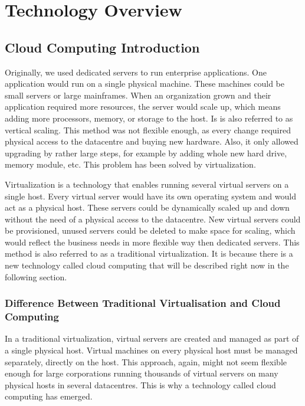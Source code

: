 
\chapter{Technology Overview}
\label{ch:overview}

\section{Cloud Computing Introduction}
\label{se:cloud-intro}
Originally, we used dedicated servers to run enterprise applications. One application would run on a single physical machine. These machines could be small servers or large mainframes. When an organization grown and their application required more resources, the server would scale up, which means adding more processors, memory, or storage to the host. Is is also referred to as vertical scaling. This method was not flexible enough, as every change required physical access to the datacentre and buying new hardware. Also, it only allowed upgrading by rather large steps, for example by adding whole new hard drive, memory module, etc. This problem has been solved by virtualization.

Virtualization is a technology that enables running several virtual servers on a single host. Every virtual server would have its own operating system and would act as a physical host. These servers could be dynamically scaled up and down without the need of a physical access to the datacentre. New virtual servers could be provisioned, unused servers could be deleted to make space for scaling, which would reflect the business needs in more flexible way then dedicated servers. This method is also referred to as a traditional virtualization. It is because there is a new technology called cloud computing that will be described right now in the following section.

\subsection{Difference Between Traditional Virtualisation and Cloud Computing}
In a traditional virtualization, virtual servers are created and managed as part of a single physical host. Virtual machines on every physical host must be managed separately, directly on the host. This approach, again, might not seem flexible enough for large corporations running thousands of virtual servers on many physical hosts in several datacentres. This is why a technology called cloud computing has emerged.

